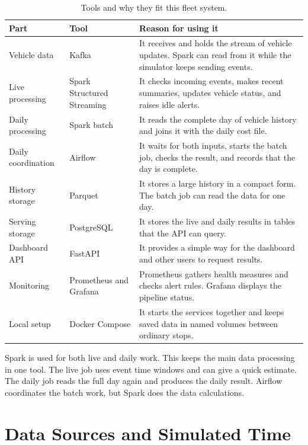 \documentclass[11pt,a4paper]{article}
\begin{document}
\begin{table}[htbp]\centering\small
\caption{Tools and why they fit this fleet system.}
\begin{tabularx}{\textwidth}{@{}>{\raggedright\arraybackslash}p{2.8cm}>{\raggedright\arraybackslash}p{3.7cm}>{\raggedright\arraybackslash}X@{}}
\toprule
\textbf{Part} & \textbf{Tool} & \textbf{Reason for using it}\\
\midrule
Vehicle data & Kafka & It receives and holds the stream of vehicle updates. Spark can read from it while the simulator keeps sending events.\\
Live processing & Spark Structured Streaming & It checks incoming events, makes recent summaries, updates vehicle status, and raises idle alerts.\\
Daily processing & Spark batch & It reads the complete day of vehicle history and joins it with the daily cost file.\\
Daily coordination & Airflow & It waits for both inputs, starts the batch job, checks the result, and records that the day is complete.\\
History storage & Parquet & It stores a large history in a compact form. The batch job can read the data for one day.\\
Serving storage & PostgreSQL & It stores the live and daily results in tables that the API can query.\\
Dashboard API & FastAPI & It provides a simple way for the dashboard and other users to request results.\\
Monitoring & Prometheus and Grafana & Prometheus gathers health measures and checks alert rules. Grafana displays the pipeline status.\\
Local setup & Docker Compose & It starts the services together and keeps saved data in named volumes between ordinary stops.\\
\bottomrule
\end{tabularx}
\end{table}

Spark is used for both live and daily work. This keeps the main data processing in one tool. The
live job uses event time windows and can give a quick estimate. The daily job reads the full day
again and produces the daily result. Airflow coordinates the batch work, but Spark does the data
calculations.

\section{Data Sources and Simulated Time}
\end{document}
